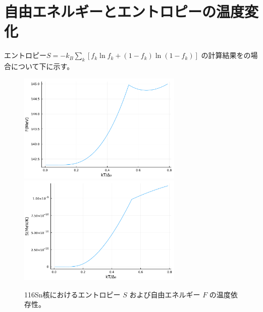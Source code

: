 \documentclass[a4paper]{jsreport}
\begin{document}
\chapter{自由エネルギーとエントロピーの温度変化}
  \vspace{-10pt}
  エントロピー\(S = -k_B \sum_{k}\left[f_k \ln f_k +(1 -f_k)\ln (1-f_k) \right]\)
  の計算結果をの場合について下に示す。
  \vspace{-5pt}
  \begin{figure}[H]
    \centering
    \includegraphics[width=0.7\textwidth]{main_fig/F_kT.pdf}
    \includegraphics[width=0.7\textwidth]{main_fig/S_kT.pdf}
    \caption{116Sn核におけるエントロピー $S$ および自由エネルギー $F$ の温度依存性。}
  \end{figure}
\end{document}

